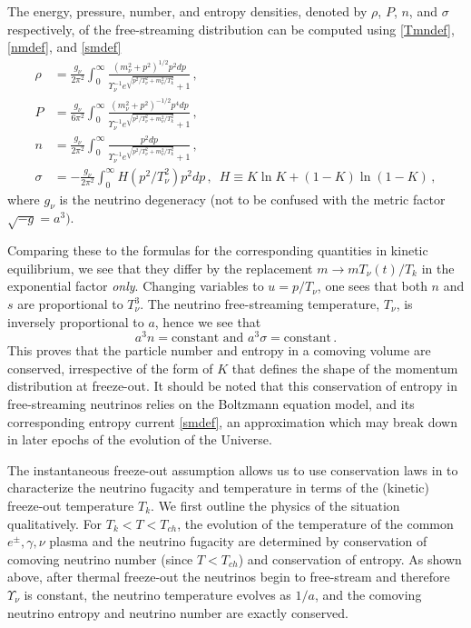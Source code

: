 The energy, pressure, number, and entropy densities, denoted by $\rho$, $P$, $n$, and $\sigma$ respectively, of the free-streaming distribution  can be computed using \eqref{Tmndef}, \eqref{nmdef}, and \eqref{smdef}
\begin{align}
\rho&=\frac{g_\nu}{2\pi^2}\!\int_0^\infty\!\!\!\frac{\left(m_\nu^2+p^2\right)^{1/2}p^2dp }{\Upsilon_\nu^{-1}e^{\sqrt{p^2/T_\nu^2+m_\nu^2/T_k^2}}+ 1}\,,\label{eq:NeutrinoRho}\\[0.2cm]
P&=\frac{g_\nu}{6\pi^2}\!\int_0^\infty\!\!\!\frac{\left(m_\nu^2+p^2\right)^{-1/2}p^4dp }{\Upsilon_\nu^{-1} e^{\sqrt{p^2/T_\nu^2+m_\nu^2/T_k^2}}+ 1}\,,\label{eq:NeutrinoP}\\[0.2cm]
n&=\frac{g_\nu}{2\pi^2}\!\int_0^\infty\!\!\!\frac{p^2dp }{\Upsilon_\nu^{-1}e^{\sqrt{p^2/T_\nu^2+m_\nu^2/T_k^2}}+ 1}\,,\label{eq:NumDensity}\\[0.3cm]
\sigma&=-\frac{g_\nu}{2\pi^2}\!\int_0^\infty\!\!\!H(p^2/T_\nu^2)p^2dp\,,\,\,\,H\equiv K\ln K +(1-K)\ln(1-K)\,,\label{eq:EntropyIntegrand}
\end{align}
where $g_\nu$ is the neutrino degeneracy (not to be confused with the metric factor $\sqrt{-g}=a^3)$.

Comparing these to the  formulas for the corresponding quantities in kinetic equilibrium, we see that they differ by the replacement $m\rightarrow m T_\nu(t)/T_k$ in the exponential factor {\em only}. Changing variables to $u=p/T_\nu$, one sees that both $n$ and $s$ are proportional to $T_\nu^3$. The neutrino free-streaming temperature, $T_\nu$, is inversely proportional to $a$, hence we see that
\begin{equation}\label{eq:ConstEntropy}
a^3n=\text{constant}\text{ and } a^3\sigma=\text{constant}\,.
\end{equation}
This proves that the particle number and entropy in a comoving volume are conserved, irrespective of the form of $K$ that defines the shape of the momentum distribution at freeze-out. It should be noted that this conservation of entropy in free-streaming neutrinos relies on the Boltzmann equation model, and its corresponding entropy current \eqref{smdef}, an approximation which may break down in later epochs of the evolution of the Universe. 

The instantaneous freeze-out assumption allows us to use conservation laws in  to characterize the neutrino fugacity and temperature in terms of the (kinetic) freeze-out temperature $T_k$. We first outline the physics of the situation qualitatively. For $T_k<T<T_{ch}$, the evolution of the temperature of the common $e^\pm,\gamma,\nu$ plasma and the neutrino fugacity are determined by conservation of comoving neutrino number (since $T<T_{ch}$) and conservation of entropy. As shown above, after thermal freeze-out the neutrinos begin to free-stream and therefore $\Upsilon_\nu$ is constant, the neutrino temperature evolves as $1/a$, and the comoving neutrino entropy and neutrino number are exactly conserved. 

